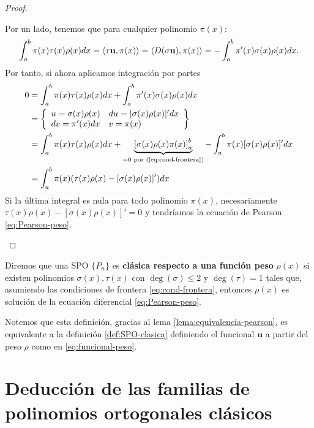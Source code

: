\begin{proof}
\begin{itemize}
        Por un lado, tenemos que para cualquier polinomio $\pi(x)$:
        $$
        \int_a^b \pi(x)\tau(x)\rho(x)dx = \left\langle \tau \mathbf{u} , \pi(x) \right\rangle= \left\langle D(\sigma \mathbf{u}) , \pi(x) \right\rangle = -\int_a^b \pi'(x) \sigma(x)\rho(x) dx.
        $$
        Por tanto, si ahora aplicamos integración por partes
        \begin{equation*}
            \begin{split}
                0 &= \int_a^b \pi(x)\tau(x)\rho(x)dx + \int_a^b \pi'(x) \sigma(x)\rho(x) dx \\
                &= \left\{\begin{array}{ll}
                    u = \sigma(x)\rho(x) & du=[\sigma(x)\rho(x)]'dx \\
                    dv = \pi'(x) dx & v = \pi(x)
                \end{array}\right\} \\
                &= \int_a^b \pi(x)\tau(x)\rho(x)dx + \underbrace{\left[\sigma(x)\rho(x)\pi(x)\right]_a^b}_{=0\text{ por (\ref{eq:cond-frontera})}} - \int_a^b \pi(x)[\sigma(x)\rho(x)]'dx \\
                &= \int_a^b \pi(x)(\tau(x)\rho(x) - [\sigma(x)\rho(x)]' )dx
            \end{split}
        \end{equation*}
        Si la última integral es nula para todo polinomio $\pi(x)$, necesariamente $\tau(x)\rho(x) - [\sigma(x)\rho(x)]' =0$ y tendríamos la ecuación de Pearson \eqref{eq:Pearson-peso}.
    \end{itemize}
    
    
\end{proof}

\begin{definicion}
    Diremos que una SPO $\{P_n\}$ es \textbf{clásica respecto a una función peso} $\rho(x)$ si existen polinomios $\sigma(x),\tau(x)$ con $\deg(\sigma)\leq 2$ y $\deg(\tau)=1$ tales que, asumiendo las condiciones de frontera \eqref{eq:cond-frontera}, entonces $\rho(x)$ es solución de la ecuación diferencial \eqref{eq:Pearson-peso}.
\end{definicion}

Notemos que esta definición, gracias al lema \ref{lema:equivalencia-pearson}, es equivalente a la definición \ref{def:SPO-clasica} definiendo el funcional $\mathbf{u}$ a partir del peso $\rho$ como en \eqref{eq:funcional-peso}.


\section{Deducción de las familias de polinomios ortogonales clásicos}
\label{section:deduccion-clasicos}

